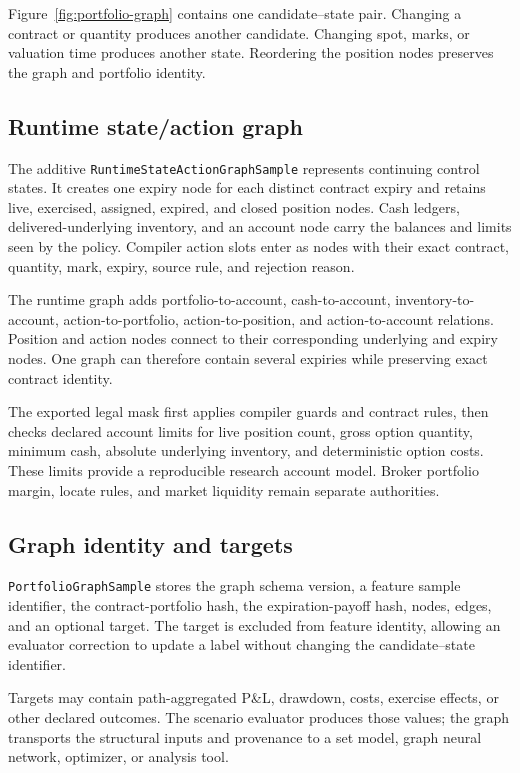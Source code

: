 \documentclass{strategynet-journal}
\begin{document}
Figure~\ref{fig:portfolio-graph} contains one candidate--state pair.  Changing
a contract or quantity produces another candidate.  Changing spot, marks, or
valuation time produces another state.  Reordering the position nodes
preserves the graph and portfolio identity.

\subsection{Runtime state/action graph}

The additive \texttt{RuntimeStateActionGraphSample} represents continuing
control states.  It creates one expiry node for each distinct contract expiry
and retains live, exercised, assigned, expired, and closed position nodes.
Cash ledgers, delivered-underlying inventory, and an account node carry the
balances and limits seen by the policy.  Compiler action slots enter as nodes
with their exact contract, quantity, mark, expiry, source rule, and rejection
reason.

The runtime graph adds portfolio-to-account, cash-to-account,
inventory-to-account, action-to-portfolio, action-to-position, and
action-to-account relations.  Position and action nodes connect to their
corresponding underlying and expiry nodes.  One graph can therefore contain
several expiries while preserving exact contract identity.

The exported legal mask first applies compiler guards and contract rules, then
checks declared account limits for live position count, gross option
quantity, minimum cash, absolute underlying inventory, and deterministic
option costs.  These limits provide a reproducible research account model.
Broker portfolio margin, locate rules, and market liquidity remain separate
authorities.

\subsection{Graph identity and targets}

\texttt{PortfolioGraphSample} stores the graph schema version, a feature
sample identifier, the contract-portfolio hash, the expiration-payoff hash,
nodes, edges, and an optional target.  The target is excluded from feature
identity, allowing an evaluator correction to update a label without changing
the candidate--state identifier.

Targets may contain path-aggregated P\&L, drawdown, costs, exercise effects,
or other declared outcomes.  The scenario evaluator produces those values;
the graph transports the structural inputs and provenance to a set model,
graph neural network, optimizer, or analysis tool.
\end{document}

